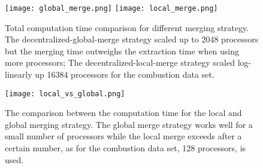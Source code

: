 \begin{figure}[ht]
	\centering
	\texttt{[image: global\_merge.png]}
	\texttt{[image: local\_merge.png]}
	\caption{Total computation time comparison for different merging strategy. The decentralized-global-merge strategy scaled up to 2048 processors but the merging time outweighs the extraction time when using more processors; The decentralized-local-merge strategy scaled log-linearly up 16384 processors for the combustion data set.}
	\label{fig:global-merge}
\end{figure}

\begin{figure}[ht]
	\centering
	\texttt{[image: local\_vs\_global.png]}
	\caption{The comparison between the computation time for the local and global merging strategy. The global merge strategy works well for a small number of processors while the local merge exceeds after a certain number, as for the combustion data set, 128 processors, is used.}
	\label{fig:local-vs-global}
\end{figure}
